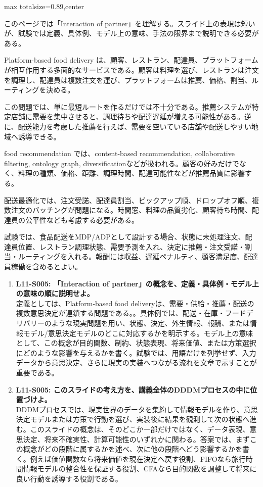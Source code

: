 \begin{minipage}[t]{0.58\textwidth}
\begin{adjustbox}{max totalsize={\textwidth}{0.89\textheight},center}
\begin{minipage}{\textwidth}\scriptsize
{}このページでは「Interaction of partner」を理解する。スライド上の表現は短いが、試験では定義、具体例、モデル上の意味、手法の限界まで説明できる必要がある。\par
Platform-based food delivery は、顧客、レストラン、配達員、プラットフォームが相互作用する多面的なサービスである。顧客は料理を選び、レストランは注文を調理し、配達員は複数注文を運び、プラットフォームは推薦、価格、割当、ルーティングを決める。\par
この問題では、単に最短ルートを作るだけでは不十分である。推薦システムが特定店舗に需要を集中させると、調理待ちや配達遅延が増える可能性がある。逆に、配送能力を考慮した推薦を行えば、需要を空いている店舗や配送しやすい地域へ誘導できる。\par
food recommendation では、content-based recommendation, collaborative filtering, ontology graph, diversificationなどが扱われる。顧客の好みだけでなく、料理の種類、価格、距離、調理時間、配達可能性などが推薦品質に影響する。\par
配送最適化では、注文受諾、配達員割当、ピックアップ順、ドロップオフ順、複数注文のバッチングが問題になる。時間窓、料理の品質劣化、顧客待ち時間、配達員の公平性なども考慮する必要がある。\par
試験では、食品配送をMDP/ADPとして設計する場合、状態に未処理注文、配達員位置、レストラン調理状態、需要予測を入れ、決定に推薦・注文受諾・割当・ルーティングを入れる。報酬には収益、遅延ペナルティ、顧客満足度、配達員稼働を含めるとよい。\par{}\begin{enumerate}\item \textbf{L11-S005: 「Interaction of partner」の概念を、定義・具体例・モデル上の意味の順に説明せよ。}\\定義としては、Platform-based food deliveryは、需要・供給・推薦・配送の複数意思決定が連鎖する問題である。。具体例では、配送・在庫・フードデリバリーのような現実問題を用い、状態、決定、外生情報、報酬、または情報モデル/意思決定モデルのどこに対応するかを明示する。モデル上の意味として、この概念が目的関数、制約、状態表現、将来価値、または方策選択にどのような影響を与えるかを書く。試験では、用語だけを列挙せず、入力データから意思決定、さらに現実の実装へつながる流れを文章で示すことが重要である。\item \textbf{L11-S005: このスライドの考え方を、講義全体のDDDMプロセスの中に位置づけよ。}\\DDDMプロセスでは、現実世界のデータを集約して情報モデルを作り、意思決定モデルまたは方策で行動を選び、実装後に結果を観測して次の状態へ進む。このスライドの概念は、そのどこか一部だけではなく、データ表現、意思決定、将来不確実性、計算可能性のいずれかに関わる。答案では、まずこの概念がどの段階に属するかを述べ、次に他の段階へどう影響するかを書く。例えば価値関数なら将来価値を現在決定へ戻す役割、FIFOなら旅行時間情報モデルの整合性を保証する役割、CFAなら目的関数を調整して将来に良い行動を誘導する役割である。\end{enumerate}

\end{minipage}
\end{adjustbox}
\end{minipage}
